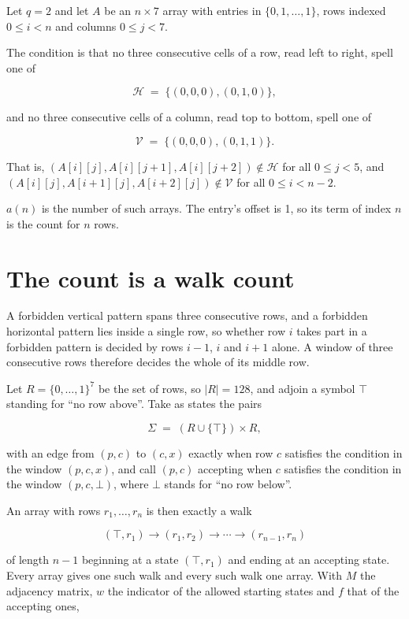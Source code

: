 \documentclass[11pt]{article}
\theoremstyle{definition}
\begin{document}
Let $q = 2$ and let $A$ be an $n \times 7$ array with entries in $\{0,1,\dots,1\}$, rows indexed $0 \le i < n$ and columns $0 \le j < 7$.

The condition is that no three consecutive cells of a row, read left to right, spell one of

\[\mathcal{H} \;=\; \{(0,0,0), (0,1,0)\},\]

and no three consecutive cells of a column, read top to bottom, spell one of

\[\mathcal{V} \;=\; \{(0,0,0), (0,1,1)\}.\]

That is, $(A[i][j],A[i][j{+}1],A[i][j{+}2]) \notin \mathcal{H}$ for all $0 \le j < 5$, and $(A[i][j],A[i{+}1][j],A[i{+}2][j]) \notin \mathcal{V}$ for all $0 \le i < n-2$.

$a(n)$ is the number of such arrays. The entry's offset is 1, so its term of index $n$ is the count for $n$ rows.

\section{The count is a walk count}

A forbidden vertical pattern spans three consecutive rows, and a forbidden horizontal pattern lies inside a single row, so whether row $i$ takes part in a forbidden pattern is decided by rows $i-1$, $i$ and $i+1$ alone. A window of three consecutive rows therefore decides the whole of its middle row.

Let $R = \{0,\dots,1\}^{7}$ be the set of rows, so $|R| = 128$, and adjoin a symbol $\top$ standing for ``no row above''. Take as states the pairs

\[\Sigma \;=\; (R \cup \{\top\}) \times R,\]

with an edge from $(p,c)$ to $(c,x)$ exactly when row $c$ satisfies the condition in the window $(p,c,x)$, and call $(p,c)$ accepting when $c$ satisfies the condition in the window $(p,c,\bot)$, where $\bot$ stands for ``no row below''.

An array with rows $r_1,\dots,r_n$ is then exactly a walk

\[(\top,r_1) \to (r_1,r_2) \to \cdots \to (r_{n-1},r_n)\]

of length $n-1$ beginning at a state $(\top,r_1)$ and ending at an accepting state. Every array gives one such walk and every such walk one array. With $M$ the adjacency matrix, $w$ the indicator of the allowed starting states and $f$ that of the accepting ones,
\end{document}

